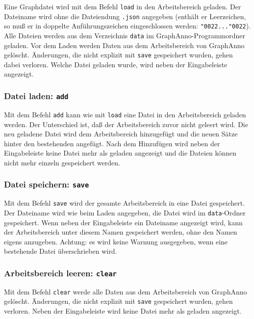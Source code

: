 \documentclass[12pt]{scrartcl}
\newcommand{\quo}{\char"0022}
\begin{document}
Eine Graphdatei wird mit dem Befehl \texttt{load} in den Arbeitsbereich geladen. Der Dateiname wird ohne die Dateiendung \texttt{.json} angegeben (enthält er Leerzeichen, so muß er in doppelte Anführungszeichen eingeschlossen werden: \texttt{\quo...\quo}). Alle Dateien werden aus dem Verzeichnis \texttt{data} im GraphAnno-Programmordner geladen. Vor dem Laden werden Daten aus dem Arbeitsbereich von GraphAnno gelöscht. Änderungen, die nicht explizit mit \texttt{save} gespeichert wurden, gehen dabei verloren.
Welche Datei geladen wurde, wird neben der Eingabeleiste angezeigt.


\subsubsection{Datei laden: \texttt{add}}

Mit dem Befehl \texttt{add} kann wie mit \texttt{load} eine Datei in den Arbeitsbereich geladen werden. Der Unterschied ist, daß der Arbeitsbereich zuvor nicht geleert wird. Die neu geladene Datei wird dem Arbeitsbereich hinzugefügt und die neuen Sätze hinter den bestehenden angefügt. Nach dem Hinzufügen wird neben der Eingabeleiste keine Datei mehr als geladen angezeigt und die Dateien können nicht mehr einzeln gespeichert werden.


\subsubsection{Datei speichern: \texttt{save}}

Mit dem Befehl \texttt{save} wird der gesamte Arbeitsbereich in eine Datei gespeichert. Der Dateiname wird wie beim Laden angegeben, die Datei wird im \texttt{data}-Ordner gespeichert. Wenn neben der Eingabeleiste ein Dateiname angezeigt wird, kann der Arbeitsbereich unter diesem Namen gespeichert werden, ohne den Namen eigens anzugeben.
Achtung: es wird keine Warnung ausgegeben, wenn eine bestehende Datei überschrieben wird.


\subsubsection{Arbeitsbereich leeren: \texttt{clear}}

Mit dem Befehl \texttt{clear} werde alle Daten aus dem Arbeitsbereich von GraphAnno gelöscht. Änderungen, die nicht explizit mit \texttt{save} gespeichert wurden, gehen verloren.
Neben der Eingabeleiste wird keine Datei mehr als geladen angezeigt.
\end{document}
